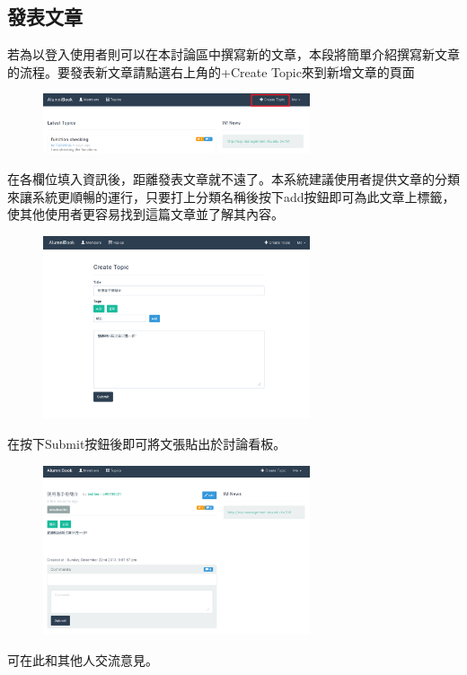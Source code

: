 \documentclass[12pt]{article}
\begin{document}
\subsection{發表文章}
若為以登入使用者則可以在本討論區中撰寫新的文章，本段將簡單介紹撰寫新文章的流程。要發表新文章請點選右上角的+Create Topic來到新增文章的頁面
\begin{figure}[H]
\centering\includegraphics[width=0.7\textwidth]{img/new01.png}
\end{figure}
在各欄位填入資訊後，距離發表文章就不遠了。本系統建議使用者提供文章的分類來讓系統更順暢的運行，只要打上分類名稱後按下add按鈕即可為此文章上標籤，使其他使用者更容易找到這篇文章並了解其內容。
\begin{figure}[H]
\centering\includegraphics[width=0.7\textwidth]{img/new02.png}
\end{figure}
在按下Submit按鈕後即可將文張貼出於討論看板。
\begin{figure}[H]
\centering\includegraphics[width=0.7\textwidth]{img/new03.png}
\end{figure}
可在此和其他人交流意見。
\end{document}
